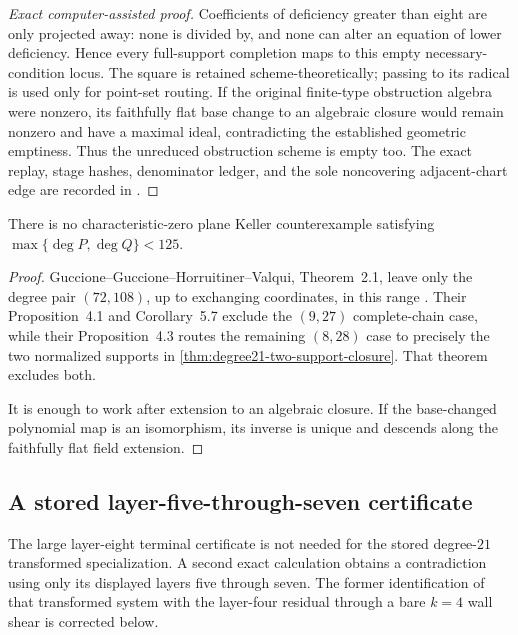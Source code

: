 \begin{proof}[Exact computer-assisted proof]
Coefficients of deficiency greater than eight are only projected away: none
is divided by, and none can alter an equation of lower deficiency.  Hence
every full-support completion maps to this empty necessary-condition locus.
The square is retained scheme-theoretically; passing to its radical is used
only for point-set routing.  If the original finite-type obstruction algebra
were nonzero, its faithfully flat base change to an algebraic closure would
remain nonzero and have a maximal ideal, contradicting the established
geometric emptiness.  Thus the unreduced obstruction scheme is empty too.
The exact replay, stage hashes, denominator ledger, and the sole noncovering
adjacent-chart edge are recorded in
.
\end{proof}

\begin{corollary}
\label{cor:plane-degree-below-125}
There is no characteristic-zero plane Keller counterexample satisfying
\(\max\{\deg P,\deg Q\}<125\).
\end{corollary}

\begin{proof}
Guccione--Guccione--Horruitiner--Valqui, Theorem~2.1, leave only the degree
pair \((72,108)\), up to exchanging coordinates, in this range
\cite{guccioneEtAl2022degree108}.  Their Proposition~4.1 and
Corollary~5.7 exclude the \((9,27)\) complete-chain case, while their
Proposition~4.3 routes the remaining \((8,28)\) case to precisely the two
normalized supports in \cref{thm:degree21-two-support-closure}.  That theorem
excludes both.

It is enough to work after extension to an algebraic closure.  If the
base-changed polynomial map is an isomorphism, its inverse is unique and
descends along the faithfully flat field extension.
\end{proof}

\subsection{A stored layer-five-through-seven certificate}
\label{subsec:two-chart-layer-seven}

The large layer-eight terminal certificate is not needed for the stored
degree-\(21\) transformed specialization.  A second exact calculation
obtains a contradiction using only its displayed layers five through seven.
The former identification of that transformed system with the layer-four
residual through a bare \(k=4\) wall shear is corrected below.

